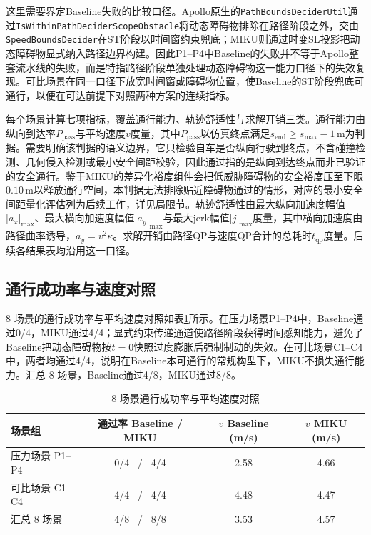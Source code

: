 \documentclass[a4paper,11pt]{ctexart}
\theoremstyle{definition}
\begin{document}
这里需要界定Baseline失败的比较口径。Apollo原生的\texttt{PathBoundsDeciderUtil}通过\texttt{IsWithinPathDeciderScopeObstacle}将动态障碍物排除在路径阶段之外，交由\texttt{SpeedBoundsDecider}在ST阶段以时间窗约束兜底；MIKU则通过时变SL投影把动态障碍物显式纳入路径边界构建。因此P1--P4中Baseline的失败并不等于Apollo整套流水线的失败，而是特指路径阶段单独处理动态障碍物这一能力口径下的失效复现。可比场景在同一口径下放宽时间窗或障碍物位置，使Baseline的ST阶段兜底可通行，以便在可达前提下对照两种方案的连续指标。

每个场景计算七项指标，覆盖通行能力、轨迹舒适性与求解开销三类。通行能力由纵向到达率$P_{\mathrm{pass}}$与平均速度$\bar v$度量，其中$P_{\mathrm{pass}}$以仿真终点满足$s_{\mathrm{end}} \geq s_{\max} - 1$\,m为判据。需要明确该判据的语义边界，它只检验自车是否纵向行驶到终点，不含碰撞检测、几何侵入检测或最小安全间距校验，因此通过指的是纵向到达终点而非已验证的安全通行。鉴于MIKU的差异化裕度组件会把低威胁障碍物的安全裕度压至下限$0.10$\,m以释放通行空间，本判据无法排除贴近障碍物通过的情形，对应的最小安全间距量化评估列为后续工作，详见局限节。轨迹舒适性由最大纵向加速度幅值$|a_x|_{\max}$、最大横向加速度幅值$|a_y|_{\max}$与最大jerk幅值$|j|_{\max}$度量，其中横向加速度由路径曲率诱导，$a_y = v^2 \kappa$。求解开销由路径QP与速度QP合计的总耗时$t_{\mathrm{qp}}$度量。后续各结果表均沿用这一口径。

\subsection{通行成功率与速度对照}
\label{subsec:exp_passrate}

8 场景的通行成功率与平均速度对照如表\ref{tab:exp_pass}所示。在压力场景P1--P4中，Baseline通过0/4，MIKU通过4/4；显式约束传递通道使路径阶段获得时间感知能力，避免了Baseline把动态障碍物按$t=0$快照过度膨胀后强制制动的失效。在可比场景C1--C4中，两者均通过4/4，说明在Baseline本可通行的常规构型下，MIKU不损失通行能力。汇总 8 场景，Baseline通过4/8，MIKU通过8/8。

\begin{table}[htbp]
\centering
\caption{8 场景通行成功率与平均速度对照}
\label{tab:exp_pass}
\small
\begin{tabular}{lccc}
\toprule
\textbf{场景组} & \textbf{通过率 Baseline / MIKU} & \textbf{$\bar v$ Baseline (m/s)} & \textbf{$\bar v$ MIKU (m/s)} \\
\midrule
压力场景 P1--P4 & 0/4 \ / \ 4/4 & 2.58 & 4.66 \\
可比场景 C1--C4 & 4/4 \ / \ 4/4 & 4.48 & 4.47 \\
\midrule
汇总 8 场景 & 4/8 \ / \ 8/8 & 3.53 & 4.57 \\
\bottomrule
\end{tabular}
\end{table}
\end{document}
